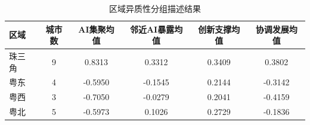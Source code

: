 \begin{table}[htbp]
\centering
\caption{区域异质性分组描述结果}
\label{tab:regional-heterogeneity}
{\tablebodyformat
\begin{tabular*}{\textwidth}{@{\extracolsep{\fill}}lccccc}
\toprule
区域 & 城市数 & AI集聚均值 & 邻近AI暴露均值 & 创新支撑均值 & 协调发展均值 \\
\midrule
珠三角 & 9 & 0.8313 & 0.3312 & 0.3409 & 0.3802 \\
粤东 & 4 & -0.5950 & -0.1545 & 0.2144 & -0.3142 \\
粤西 & 3 & -0.7050 & -0.0279 & 0.2041 & -0.4159 \\
粤北 & 5 & -0.5973 & 0.1026 & 0.2729 & -0.1836 \\
\bottomrule
\end{tabular*}
}
\end{table}
